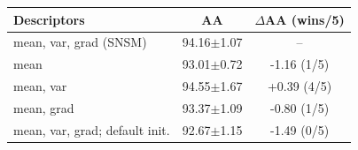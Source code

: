 \begin{tabular}{lcc}
\toprule
Descriptors & AA & $\Delta$AA (wins/5) \\
\midrule
mean, var, grad (SNSM) & 94.16$\pm$1.07 & -- \\
mean & 93.01$\pm$0.72 & -1.16 (1/5) \\
mean, var & 94.55$\pm$1.67 & +0.39 (4/5) \\
mean, grad & 93.37$\pm$1.09 & -0.80 (1/5) \\
mean, var, grad; default init. & 92.67$\pm$1.15 & -1.49 (0/5) \\
\bottomrule
\end{tabular}
